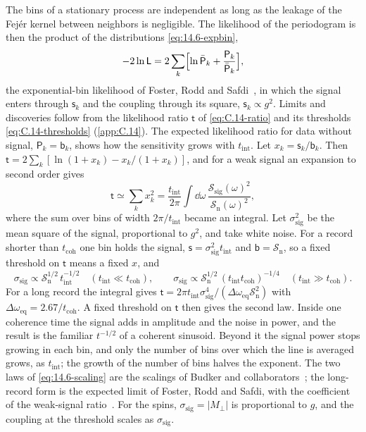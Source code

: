 The bins of a stationary process are independent as long as the leakage of the Fejér kernel between neighbors is negligible. The likelihood of the periodogram is then the product of the distributions \cref{eq:14.6-expbin},
\begin{equation}
  -2\ln\mathsf{L} = 2\sum_k\Bigl[\ln\bar{\mathsf{P}}_k + \frac{\mathsf{P}_k}{\bar{\mathsf{P}}_k}\Bigr] ,
  \label{eq:14.6-like}
\end{equation}
the exponential-bin likelihood of Foster, Rodd and Safdi~\cite[Eq.~(29)]{foster2018revealing}, in which the signal enters through $\mathsf{s}_k$ and the coupling through its square, $\mathsf{s}_k \propto g^2$. Limits and discoveries follow from the likelihood ratio $\mathsf{t}$ of \cref{eq:C.14-ratio} and its thresholds \cref{eq:C.14-thresholds} (\cref{app:C.14}). The expected likelihood ratio for data without signal, $\mathsf{P}_k = \mathsf{b}_k$, shows how the sensitivity grows with $t_{\mathrm{int}}$. Let $x_k = \mathsf{s}_k/\mathsf{b}_k$. Then $\mathsf{t} = 2\sum_k[\ln(1 + x_k) - x_k/(1 + x_k)]$, and for a weak signal an expansion to second order gives
\begin{equation*}
  \mathsf{t} \simeq \sum_kx_k^2 = \frac{t_{\mathrm{int}}}{2\pi}\int\dd\omega\,\frac{\mathcal{S}_{\mathrm{sig}}(\omega)^2}{\mathcal{S}_{\mathrm{n}}(\omega)^2} ,
\end{equation*}
where the sum over bins of width $2\pi/t_{\mathrm{int}}$ became an integral. Let $\sigma_{\mathrm{sig}}^2$ be the mean square of the signal, proportional to $g^2$, and take white noise. For a record shorter than $t_{\mathrm{coh}}$ one bin holds the signal, $\mathsf{s} = \sigma_{\mathrm{sig}}^2t_{\mathrm{int}}$ and $\mathsf{b} = \mathcal{S}_{\mathrm{n}}$, so a fixed threshold on $\mathsf{t}$ means a fixed $x$, and
\begin{equation}
  \sigma_{\mathrm{sig}} \propto \mathcal{S}_{\mathrm{n}}^{1/2}\,t_{\mathrm{int}}^{-1/2}\quad(t_{\mathrm{int}} \ll t_{\mathrm{coh}}), \qquad
  \sigma_{\mathrm{sig}} \propto \mathcal{S}_{\mathrm{n}}^{1/2}\,(t_{\mathrm{int}}t_{\mathrm{coh}})^{-1/4}\quad(t_{\mathrm{int}} \gg t_{\mathrm{coh}}) .
  \label{eq:14.6-scaling}
\end{equation}
For a long record the integral gives $\mathsf{t} = 2\pi t_{\mathrm{int}}\sigma_{\mathrm{sig}}^4/(\Delta\omega_{\mathrm{eq}}\mathcal{S}_{\mathrm{n}}^2)$ with $\Delta\omega_{\mathrm{eq}} = 2.67/t_{\mathrm{coh}}$. A fixed threshold on $\mathsf{t}$ then gives the second law. Inside one coherence time the signal adds in amplitude and the noise in power, and the result is the familiar $t^{-1/2}$ of a coherent sinusoid. Beyond it the signal power stops growing in each bin, and only the number of bins over which the line is averaged grows, as $t_{\mathrm{int}}$; the growth of the number of bins halves the exponent. The two laws of \cref{eq:14.6-scaling} are the scalings of Budker and collaborators~\cite[Eqs.~(A7), (A8)]{budker2014proposal}; the long-record form is the expected limit of Foster, Rodd and Safdi, with the coefficient of the weak-signal ratio~\cite[Eqs.~(54), (63), (69)]{foster2018revealing}. For the spins, $\sigma_{\mathrm{sig}} = |M_\perp|$ is proportional to $g$, and the coupling at the threshold scales as $\sigma_{\mathrm{sig}}$.

